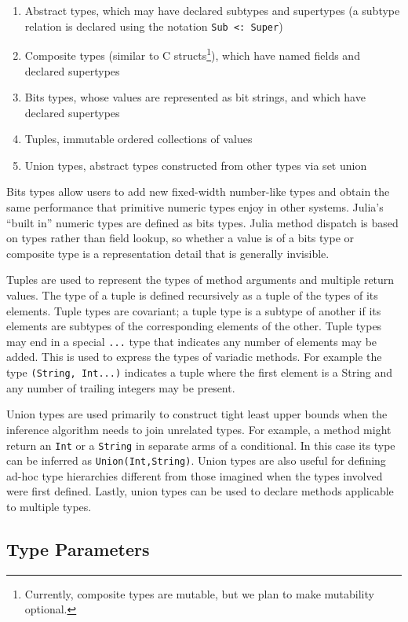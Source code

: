 \documentclass[9pt]{sigplanconf}
\begin{document}
\begin{enumerate}
\item Abstract types, which may have declared subtypes and supertypes
      (a subtype relation is declared using the notation {\tt Sub~<:~Super})
\item Composite types (similar to C structs\footnote{Currently, composite
types are mutable, but we plan to make mutability optional.}), which have
named fields and declared supertypes
\item Bits types, whose values are represented as bit strings, and which
      have declared supertypes
\item Tuples, immutable ordered collections of values
\item Union types, abstract types constructed from other types via set union
\end{enumerate}

Bits types allow users to add new fixed-width number-like types and obtain the
same performance that primitive numeric types enjoy in other systems. Julia's
``built in'' numeric types are defined as bits types. Julia method dispatch
is based on types rather than field lookup, so whether a value is of a bits
type or composite type is a representation detail that is generally
invisible.

Tuples are used to represent the types of method arguments and multiple
return values. The type of a tuple is
defined recursively as a tuple of the types of its elements. Tuple types are
covariant; a tuple type is a subtype of another if
its elements are subtypes of the corresponding elements of the other.
Tuple types may end in a special {\tt ...} type that
indicates any number of elements may be added. This is used to express the
types of variadic methods. For example the type {\tt (String, Int...)}
indicates a tuple where the first element is a String and any number of
trailing integers may be present.

Union types are used primarily to construct tight least upper bounds
when the inference algorithm needs to join unrelated types. For example,
a method might return an {\tt Int} or a {\tt String} in separate
arms of a conditional. In this case its type can be inferred as
{\tt Union(Int,String)}. Union types are also useful for defining
ad-hoc type hierarchies different from those imagined when the types
involved were first defined. Lastly,
union types can be used to declare methods applicable to multiple types.


\subsection{Type Parameters}
\end{document}
